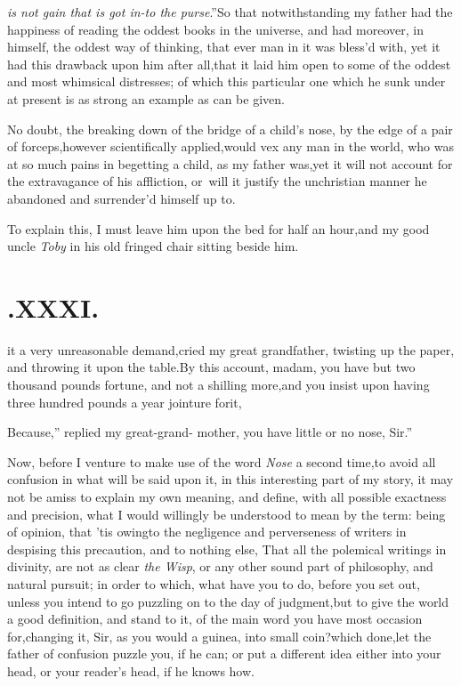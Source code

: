 \documentclass{article}
\begin{document}
\textit{is not
gain that is got in-\break to the purse}.”\tsk So that\break
notwithstanding my father had the happiness of reading the
oddest books in the universe, and had moreover, in himself, the
oddest way of thinking, that ever man in it was bless’d with, yet
it had this drawback upon him after all,\tsh that it laid him
open to some of the oddest and most whimsical distresses; of
which this particular one which he sunk under at present is as
strong an example as can be given.

No doubt, the breaking down of the bridge of a child’s
nose, by the edge of a pair of forceps,\tsk however scientifically
applied,\tsk would vex any man in the world, who was at so much
pains in begetting a child, as my father was,\tsk yet it will not
account for the extravagance of his affliction, or\sic\ will it justify
the unchristian manner he abandoned and surrender’d himself up
to.

To explain this, I must leave him upon the bed for half an
hour,\tsh and my good uncle \textit{Toby} in his old fringed
chair sitting beside him.

\section{.\quad  XXXI.}

 it a very unreason\-able
demand,\tsk cried my great\break
grandfather, twisting up the paper,
and throwing it upon the table.\tsh By this account, madam, you
have but two thou\-sand pounds fortune, and not a shilling
more,\tsh and you insist upon having three hundred pounds a year
jointure for\break it,\tsk

\tsk \lqq Because,” replied my great-grand-\break
mother, \lqq you have little or no nose,\break
\lqq Sir.”\tsh

Now, before I venture to make use
of the word \textit{Nose} a
second time,\tsk to avoid all confusion in what will be said upon
it, in this interesting part of my story, it may not be amiss to
explain my own meaning, and define, with all possible exactness and
precision, what I would willingly be understood to mean by the
term: being of opinion, that ’tis owing\break to the negligence and
perverseness of writers in despising this precaution, and to
nothing else,\tsh
That all the polemi\-cal writings in divinity, are not as clear
\textit{the Wisp}, or any
other sound part of phi\-losophy, and natural pursuit; in order to
which, what have you to do, before you set out, unless you
intend to go puzzling on to the day of judgment,\tsh but
to\break
give the world a good definition, and stand to it, of the main
word you have most occasion for,\tsh changing it, Sir, as
you would a guinea, into small coin?\tsk which done,\tsk let the
father of confusion puzzle you, if he can; or put a different
idea either into your head, or your reader’s head, if he knows
how.
\end{document}

